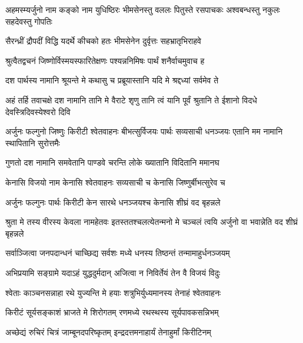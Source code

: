 \threelineshloka
{अहमस्म्यर्जुनो नाम कङ्को नाम युधिष्ठिरः}
{भीमसेनस्तु वललः पितुस्ते रसपाचकः}
{अश्वबन्धस्तु नकुलः सहदेवस्तु गोपतिः}


\twolineshloka
{सैरन्ध्रीं द्रौपदीं विद्धि यदर्थे कीचको हतः}
{भीमसेनेन दुर्वृत्तः सहभ्रातृभिराहवे}


\twolineshloka
{श्रुत्वैतद्वचनं जिष्णोर्विस्मयस्फारितेक्षणः}
{पश्यन्ननिमिषः पार्थं शनैर्वाचमुवाच ह}




\twolineshloka
{दश पार्थस्य नामानि श्रूयन्ते मे कथासु च}
{प्रब्रूयास्तानि यदि मे श्रद्दध्यां सर्वमेव ते}




\threelineshloka
{अहं तर्हि तवाचक्षे दश नामानि तानि मे}
{वैराटे शृणु तानि त्वं यानि पूर्वं श्रुतानि ते}
{ईशानो विदधे देवस्त्रिदिवस्येश्वरो दिवि}


\threelineshloka
{अर्जुनः फल्गुनो जिष्णुः किरीटी श्वेतवाहनः}
{बीभत्सुर्विजयः पार्थः सव्यसाची धनञ्जयः}
{एतानि मम नामानि स्थापितानि सुरोत्तमैः}




\twolineshloka
{गुणतो दश नामानि समवेतानि पाण्डवे}
{चरन्ति लोके ख्यातानि विदितानि ममानघ}


\twolineshloka
{केनासि विजयो नाम केनासि श्वेतवाहनः}
{सव्यसाची च केनासि जिष्णुर्बीभत्सुरेव च}


\twolineshloka
{अर्जुनः फल्गुनः पार्थः किरीटी केन सारथे}
{धनञ्जयश्च केनासि शीघ्रं वद बृहन्नले}


\threelineshloka
{श्रुता मे तस्य वीरस्य केवला नामहेतवः}
{इतस्ततश्चलत्येतन्मनो मे चञ्चलं त्वयि}
{अर्जुनो वा भवान्नेति वद शीघ्रं बृहन्नले}




\twolineshloka
{सर्वाञ्जित्वा जनपदान्धनं चाच्छिद्य सर्वशः}
{मध्ये धनस्य तिष्ठन्तं तन्मामाहुर्धनञ्जयम्}


\twolineshloka
{अभिप्रयामि सङ्ग्रामे यदाऽहं युद्धदुर्मदान्}
{अजित्वा न निविर्तेयं तेन वै विजयं विदुः}


\twolineshloka
{श्वेताः काञ्चनसन्नाहा रथे युज्यन्ति मे हयाः}
{शत्रुभिर्युध्यमानस्य तेनाहं श्वेतवाहनः}


\twolineshloka
{किरीटं सूर्यसङ्काशं भ्राजते मे शिरोगतम्}
{रणमध्ये रथस्थस्य सूर्यपावकसन्निभम्}


\twolineshloka
{अच्छेद्यं रुचिरं चित्रं जाम्बूनदपरिष्कृतम्}
{इन्द्रदत्तमनाहार्यं तेनाहुर्मां किरीटिनम्}


